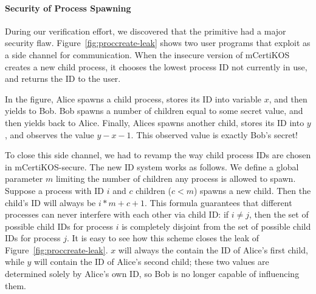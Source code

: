 \paragraph{Security of Process Spawning}
During our verification effort, we discovered that the 
primitive had a major security flaw. Figure~\ref{fig:proccreate-leak} 
shows two user programs that exploit  as
a side channel for communication. When the insecure version of 
mCertiKOS creates a new child process, it chooses the lowest process 
ID not currently in use, and returns the ID to the user. 

In the figure, Alice spawns a child process, stores its 
ID into variable $x$, and then yields to Bob. Bob 
spawns a number of children equal to some secret value,
and then yields back to Alice. Finally, Alices spawns
another child, stores its ID into $y$, and observes the
value $y-x-1$. This observed value is exactly Bob's
secret!

To close this side channel, we had to revamp the way child
process IDs are chosen in mCertiKOS-secure. The new ID system 
works as follows. We define a global parameter $m$ limiting
the number of children any process is allowed to spawn.
Suppose a process with ID $i$ and $c$ children ($c < m$)
spawns a new child. Then the child's ID will always be
$i*m + c + 1$. This formula guarantees that different
processes can never interfere with each other via child
ID: if $i \neq j$, then the set of possible child IDs for
process $i$ is completely disjoint from the set of
possible child IDs for process $j$. It is easy to see how
this scheme closes the leak of Figure~\ref{fig:proccreate-leak}.
$x$ will always the contain the ID of Alice's first
child, while $y$ will contain the ID of Alice's second
child; these two values are determined solely by Alice's
own ID, so Bob is no longer capable of influencing them.


